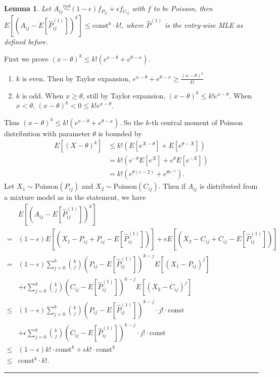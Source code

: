 \documentclass[a4paper]{article}
\newenvironment{proof}{{\bf Proof:  }}{\hfill\rule{2mm}{2mm}}
\newtheorem{lemma}[fact]{Lemma}
\renewcommand{\hat}{\widehat}
\begin{document}
\begin{lemma}
\label{lm:poisson}
Let $A_{ij} \stackrel{ind}{\sim} (1-\epsilon) f_{P_{ij}} + \epsilon f_{C_{ij}}$ with $f$ to be Poisson, then $E[(A_{ij} - E[\hat{P}_{ij}^{(1)}])^k] \le \mathrm{const}^k \cdot k!$, where $\hat{P}^{(1)}$ is the entry-wise MLE as defined before.
\end{lemma}
\begin{proof}
First we prove $(x - \theta)^k \le k! (e^{x-\theta} + e^{\theta - x})$.
\begin{enumerate}
\item $k$ is even. Then by Taylor expansion, $e^{x - \theta} + e^{\theta - x} \ge \frac{(x-\theta)^k}{k!}$
\item $k$ is odd. When $x \ge \theta$, still by Taylor expansion, $(x-\theta)^k \le k! e^{x-\theta}$. When $x < \theta$, $(x-\theta)^k < 0 \le k! e^{x-\theta}$.
\end{enumerate}
Thus $(x - \theta)^k \le k! (e^{x-\theta} + e^{\theta - x})$.
So the $k$-th central moment of Poisson distribution with parameter $\theta$ is bounded by
\begin{align*}
E[(X-\theta)^k] & \le k! \left( E[e^{X-\theta}] + E[e^{\theta - X}] \right) \\
& = k! \left( e^{-\theta} E[e^X] + e^{\theta} E[e^{-X}] \right) \\
& = k! \left( e^{\theta(e - 2)} + e^{\theta e^{-1}} \right).
\end{align*}
Let $X_1 \sim \mathrm{Poisson}(P_{ij})$ and $X_2 \sim \mathrm{Poisson}(C_{ij})$.
Then if $A_{ij}$ is distributed from a mixture model as in the statement, we have
\begin{align*}
& E[(A_{ij} - E[\hat{P}_{ij}^{(1)}])^k] \\
= & (1-\epsilon) E[(X_1 - P_{ij} + P_{ij} - E[\hat{P}_{ij}^{(1)}])] +
\epsilon E[(X_2 - C_{ij} + C_{ij} - E[\hat{P}_{ij}^{(1)}])] \\
= & (1-\epsilon) \sum_{j = 0}^k \binom{k}{j} (P_{ij} - E[\hat{P}_{ij}^{(1)}])^{k - j} E[(X_1 - P_{ij})^j] \\
& + \epsilon \sum_{j = 0}^k \binom{k}{j} (C_{ij} - E[\hat{P}_{ij}^{(1)}])^{k - j} E[(X_2 - C_{ij})^j] \\
\le & (1-\epsilon) \sum_{j = 0}^k \binom{k}{j} (P_{ij} - E[\hat{P}_{ij}^{(1)}])^{k - j} \cdot j! \cdot \mathrm{const} \\
& + \epsilon \sum_{j = 0}^k \binom{k}{j} (C_{ij} - E[\hat{P}_{ij}^{(1)}])^{k - j} \cdot j! \cdot \mathrm{const} \\ 
\le & (1-\epsilon) k! \cdot \mathrm{const}^k + \epsilon k! \cdot \mathrm{const}^k \\
\le & \mathrm{const}^k \cdot k!.
\end{align*}
\end{proof}
\end{document}

